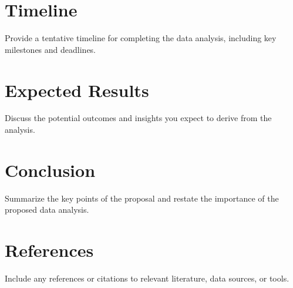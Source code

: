 \documentclass[a4paper,12pt]{article}
\begin{document}
\section{Timeline}
Provide a tentative timeline for completing the data analysis, including key milestones and deadlines.

\section{Expected Results}
Discuss the potential outcomes and insights you expect to derive from the analysis.

\section{Conclusion}
Summarize the key points of the proposal and restate the importance of the proposed data analysis.

\section*{References}
Include any references or citations to relevant literature, data sources, or tools.
\end{document}
